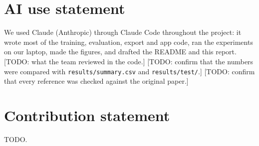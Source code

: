 \documentclass[conference]{IEEEtran}
\begin{document}
\section*{AI use statement}
We used Claude (Anthropic) through Claude Code throughout the project: it wrote most of the training,
evaluation, export and app code, ran the experiments on our laptop, made the figures, and drafted the README
and this report. [TODO: what the team reviewed in the code.] [TODO: confirm that the numbers were compared
with \texttt{results/summary.csv} and \texttt{results/test/}.] [TODO: confirm that every reference was checked
against the original paper.]

\section*{Contribution statement}
TODO.



\end{document}
